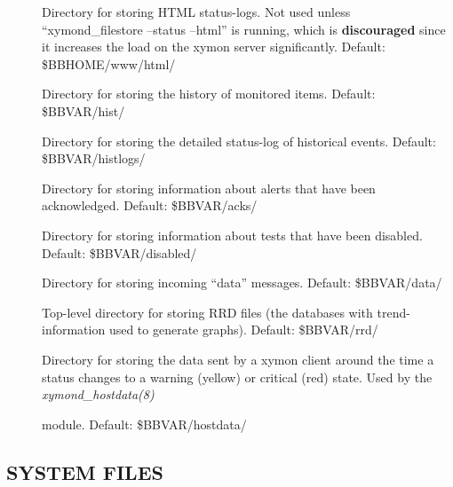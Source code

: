 \begin{description}
 

\item[] Directory for storing HTML status-logs. Not used unless
  ``xymond\_filestore --status --html'' is running, which is
  \textbf{discouraged} since it increases the load on the xymon
  server significantly. Default: \$BBHOME/www/html/ 


 

\item[] Directory for storing the history of monitored items. Default: \$BBVAR/hist/ 

 

\item[] Directory for storing the detailed status-log of
  historical events. Default: \$BBVAR/histlogs/ 


 

\item[] Directory for storing information about alerts that have been acknowledged. Default: \$BBVAR/acks/ 

 

\item[] Directory for storing information about tests that have been disabled. Default: \$BBVAR/disabled/ 

 

\item[] Directory for storing incoming ``data'' messages. Default: \$BBVAR/data/ 

 

\item[] Top-level directory for storing RRD files (the databases
  with trend-information used to generate graphs). Default:
  \$BBVAR/rrd/ 


 

\item[] Directory for storing the data sent by a xymon
  client around the time a status changes to a warning (yellow) or
  critical (red) state. Used by the \emph{xymond\_hostdata(8)}

 module. Default: \$BBVAR/hostdata/ 

 


 


\end{description}

\subsection{SYSTEM FILES}


